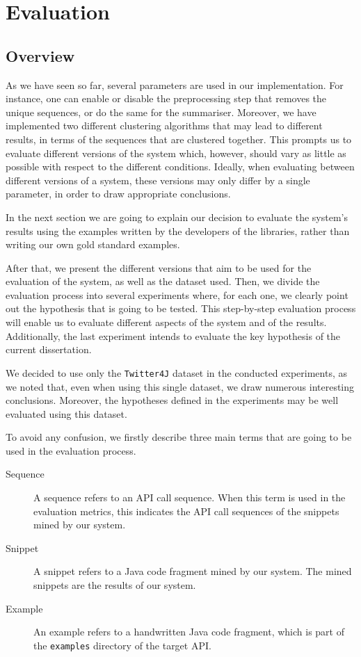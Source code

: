 \chapter{Evaluation}
\label{chap:evaluation}

\section{Overview}
\label{sec:evaluation-overview}

As we have seen so far, several parameters are used in our implementation. For instance, one can enable or disable the preprocessing step that removes the unique sequences, or do the same for the summariser. Moreover, we have implemented two different clustering algorithms that may lead to different results, in terms of the sequences that are clustered together. This prompts us to evaluate different versions of the system which, however, should vary as little as possible with respect to the different conditions. Ideally, when evaluating between different versions of a system, these versions may only differ by a single parameter, in order to draw appropriate conclusions.

In the next section we are going to explain our decision to evaluate the system's results using the examples written by the developers of the libraries, rather than writing our own gold standard examples.

After that, we present the different versions that aim to be used for the evaluation of the system, as well as the dataset used. Then, we divide the evaluation process into several experiments where, for each one, we clearly point out the hypothesis that is going to be tested. This step-by-step evaluation process will enable us to evaluate different aspects of the system and of the results. Additionally, the last experiment intends to evaluate the key hypothesis of the current dissertation.

We decided to use only the \texttt{Twitter4J} dataset in the conducted experiments, as we noted that, even when using this single dataset, we draw numerous interesting conclusions. Moreover, the hypotheses defined in the experiments may be well evaluated using this dataset.

To avoid any confusion, we firstly describe three main terms that are going to be used in the evaluation process.

\begin{description}
\item[Sequence] A sequence refers to an API call sequence. When this term is used in the evaluation metrics, this indicates the API call sequences of the snippets mined by our system.
\item[Snippet] A snippet refers to a Java code fragment mined by our system. The mined snippets are the results of our system.
\item[Example] An example refers to a handwritten Java code fragment, which is part of the \texttt{examples} directory of the target API. 
\end{description}



